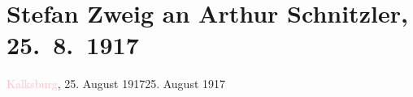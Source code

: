 

\renewcommand{\erwaehntePersonen}{Personen: Franz Werfel, Stefan Zweig}
\renewcommand{\erwaehnteOrte}{Orte: Kalksburg, Wien}
\renewcommand{\erwaehnteWerke}{Werke: Der Ruf des Lebens. Schauspiel in drei Akten, Doktor Gräsler, Badearzt, Frau Beate und ihr Sohn. Novelle, Frau Bertha Garlan. Roman, Jeremias. Ein dramatische Dichtung in neun Bildern, Masken und Wunder. Novellen, Reigen. Zehn Dialoge}
\section[Stefan Zweig an Arthur Schnitzler, 25. 8. 1917]{Stefan Zweig an Arthur Schnitzler, 25. 8. 1917}
\nopagebreak{}
\rehead{ }\normalsize\beginnumbering{}
\toendnotes[C]{\smallbreak\pagebreak[2]}
\toendnotes[C]{\smallbreak}
\pstart
           {\pb}\textcolor{pink}{Kalksburg}{}\ledrightnote{\textcolor{pink}{Kalksburg}}, 25. August 191725. August 1917\pend
           

